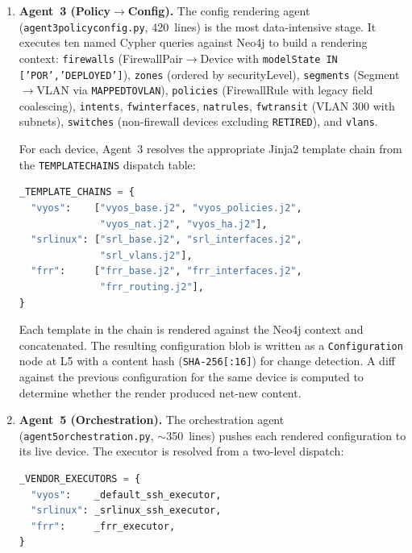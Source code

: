 \documentclass[acmtog]{acmart}
\renewcommand\_{\textunderscore\allowbreak}
\begin{document}
\begin{enumerate}[label=\textbf{Stage~\arabic*.},leftmargin=3em]
    For \texttt{LOW}/\texttt{INFO} severity, the gate auto-approves
    (configurable via \texttt{IBN\_AUTO\_APPROVE=1} for test
    environments).

  \item \textbf{Agent~3 (Policy$\rightarrow$Config).}
    The config rendering agent (\texttt{agent3\_policy\_config.py},
    420~lines) is the most data-intensive stage. It executes ten
    named Cypher queries against Neo4j to build a rendering context:
    \texttt{firewalls} (FirewallPair$\rightarrow$Device with
    \texttt{modelState IN ['POR','DEPLOYED']}), \texttt{zones}
    (ordered by securityLevel), \texttt{segments}
    (Segment$\rightarrow$VLAN via \texttt{MAPPED\_TO\_VLAN}),
    \texttt{policies} (FirewallRule with legacy field coalescing),
    \texttt{intents}, \texttt{fw\_interfaces},
    \texttt{nat\_rules}, \texttt{fw\_transit} (VLAN 300 with
    subnets), \texttt{switches} (non-firewall devices excluding
    \texttt{RETIRED}), and \texttt{vlans}.

    For each device, Agent~3 resolves the appropriate Jinja2
    template chain from the \texttt{\_TEMPLATE\_CHAINS} dispatch
    table:

    \begin{lstlisting}[language=Python,caption={Template chains per vendor.}]
_TEMPLATE_CHAINS = {
  "vyos":    ["vyos_base.j2", "vyos_policies.j2",
              "vyos_nat.j2", "vyos_ha.j2"],
  "srlinux": ["srl_base.j2", "srl_interfaces.j2",
              "srl_vlans.j2"],
  "frr":     ["frr_base.j2", "frr_interfaces.j2",
              "frr_routing.j2"],
}
    \end{lstlisting}

    Each template in the chain is rendered against the Neo4j context
    and concatenated. The resulting configuration blob is written as a
    \texttt{Configuration} node at L5 with a content hash
    (\texttt{SHA-256[:16]}) for change detection. A diff against the
    previous configuration for the same device is computed to
    determine whether the render produced net-new content.

  \item \textbf{Agent~5 (Orchestration).}
    The orchestration agent (\texttt{agent5\_orchestration.py},
    $\sim$350~lines) pushes each rendered configuration to its live
    device. The executor is resolved from a two-level dispatch:

    \begin{lstlisting}[language=Python,caption={Executor dispatch with transport override.}]
_VENDOR_EXECUTORS = {
  "vyos":    _default_ssh_executor,
  "srlinux": _srlinux_ssh_executor,
  "frr":     _frr_executor,
}


\end{lstlisting}
\end{enumerate}
\end{document}
